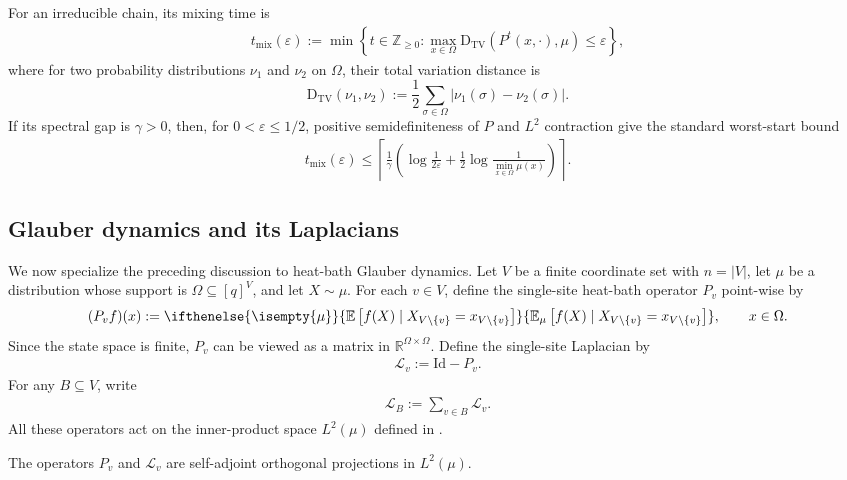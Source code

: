 \documentclass[a4paper,12pt]{article}
\theoremstyle{plain}
\theoremstyle{definition}
\def\+#1{\mathcal{#1}} %
\def\-#1{\mathrm{#1}} %
\def\+#1{\mathcal{#1}} %
\def\-#1{\mathrm{#1}} %
\def\oE{\mathbb{E}}
\newcommand{\E}[2][]{ \ifthenelse{\isempty{#1}}
  {\oE\left[#2\right]}
  {\oE_{#1}\left[#2\right]} }
\newcommand{\DTV}[2]{\-D_{\mathrm{TV}}\left({#1},{#2}\right)}
\begin{document}
For an irreducible chain, its mixing time is
\begin{align*}
  t_{\mathrm{mix}}(\varepsilon)
  :=\min\left\{t\in\mathbb Z_{\geq0}:
    \max_{x\in\Omega}\DTV{P^t(x,\cdot)}{\mu}
    \leq\varepsilon\right\},
\end{align*}
where for two probability
distributions $\nu_1$ and $\nu_2$ on $\Omega$, their total variation
distance is
\[
  \DTV{\nu_1}{\nu_2}
  :=\frac12\sum_{\sigma\in\Omega}
    |\nu_1(\sigma)-\nu_2(\sigma)|.
\]
If its spectral gap is $\gamma>0$, then, for
$0<\varepsilon\leq1/2$, positive semidefiniteness of $P$ and $L^2$
contraction give the standard worst-start bound
\cite[Theorem~12.4]{LevinPeres2017}
\begin{align}\label{eq:spgap-implies-mixing-time}
  t_{\mathrm{mix}}(\varepsilon)
  \leq\left\lceil\frac1\gamma\left(
    \log\frac1{2\varepsilon}
    +\frac12\log\frac1{\min_{x\in\Omega}\mu(x)}
  \right)\right\rceil.
\end{align}

\subsection{Glauber dynamics and its Laplacians}
We now specialize the preceding discussion to heat-bath Glauber
dynamics.
Let $V$ be a finite coordinate set with $n=|V|$, let $\mu$ be a
distribution whose support is $\Omega\subseteq[q]^V$, and let
$X\sim\mu$.  For each $v\in V$, define the single-site heat-bath operator
$P_v$ point-wise by
\begin{align} \label{def-Pi}
  (P_vf)(x)
  :=\E[\mu]{f(X)\mid
    X_{V\setminus\{v\}}=x_{V\setminus\{v\}}},
  \qquad x\in\Omega.
\end{align}
Since the state space is finite, $P_v$ can be viewed as a matrix in
$\mathbb{R}^{\Omega\times\Omega}$.  Define the single-site Laplacian by
\begin{align} \label{def-Li}
  \+L_v:=\mathrm{Id}-P_v.
\end{align}
For any $B\subseteq V$, write
\begin{align} \label{def-LB}
  \+L_B:=\sum_{v\in B}\+L_v.
\end{align}
All these operators act on the inner-product space $L^2(\mu)$ defined in
.

\begin{fact}
  The operators $P_v$ and $\+L_v$ are self-adjoint orthogonal
  projections in $L^2(\mu)$.
\end{fact}
\end{document}
